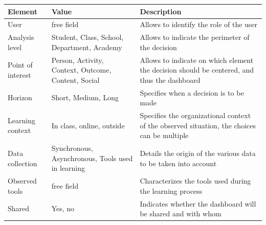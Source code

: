 \documentclass[preprint,12pt]{elsarticle}
\begin{document}
\begingroup
\setlength{\tabcolsep}{10pt} %
\renewcommand{\arraystretch}{1.5} %
\begin{table}[]
    \footnotesize
    \label{tab:eltdesc}
    \centering
    \begin{tabular}{@{}p{2.7cm}p{4.5cm}p{8.2cm}@{}}
    \toprule
    Element           & Value                                                           & Description                                                                                                                        \\ \midrule
    User              & free field                                                      & Allows to identify the role of the user                                                                                            \\
    Analysis level    & Student, Class, School, Department, Academy                     & Allows to indicate the perimeter of the decision                                                                                   \\
    Point of interest & Person, Activity, Context, Outcome, Content, Social             & Allows to indicate on which element the decision should be centered, and thus the dashboard                                        \\
    Horizon           & Short, Medium, Long                                             & Specifies when a decision is to be made                                                                                            \\
    Learning context  & In class, online, outside                                       & Specifies the organizational context of the observed situation, the choices can be multiple                                        \\
    Data collection   & Synchronous, Asynchronous, Tools used in learning & Details the origin of the various data to be taken into account                                                                    \\
    Observed tools    & free field                                                      & Characterizes the tools used during the learning process                                                                           \\
    Shared            & Yes, no                                                         & Indicates whether the dashboard will be shared and with whom                                                                       \\

\end{tabular}
\end{table}
\end{document}
